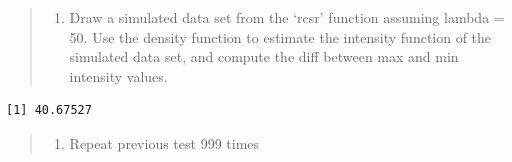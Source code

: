 \documentclass[
  letterpaper,
  DIV=11,
  numbers=noendperiod]{scrartcl}
\newenvironment{Shaded}{\begin{snugshade}}{\end{snugshade}}
\newcommand{\AttributeTok}[1]{\textcolor[rgb]{0.40,0.45,0.13}{#1}}
\newcommand{\DecValTok}[1]{\textcolor[rgb]{0.68,0.00,0.00}{#1}}
\newcommand{\FunctionTok}[1]{\textcolor[rgb]{0.28,0.35,0.67}{#1}}
\newcommand{\NormalTok}[1]{\textcolor[rgb]{0.00,0.23,0.31}{#1}}
\newcommand{\OtherTok}[1]{\textcolor[rgb]{0.00,0.23,0.31}{#1}}
\newcommand{\SpecialCharTok}[1]{\textcolor[rgb]{0.37,0.37,0.37}{#1}}
\providecommand{\tightlist}{%
  \setlength{\itemsep}{0pt}\setlength{\parskip}{0pt}}\usepackage{longtable,booktabs,array}
\begin{document}
\begin{quote}
\begin{enumerate}
\def\labelenumi{\arabic{enumi}.}
\setcounter{enumi}{1}
\tightlist
\item
  Draw a simulated data set from the `rcsr' function assuming lambda =
  50. Use the density function to estimate the intensity function of the
  simulated data set, and compute the diff between max and min intensity
  values.
\end{enumerate}
\end{quote}

\begin{Shaded}
\end{Shaded}

\begin{verbatim}
[1] 40.67527
\end{verbatim}

\begin{quote}
\begin{enumerate}
\def\labelenumi{\arabic{enumi}.}
\setcounter{enumi}{2}
\tightlist
\item
  Repeat previous test 999 times
\end{enumerate}
\end{quote}
\end{document}
